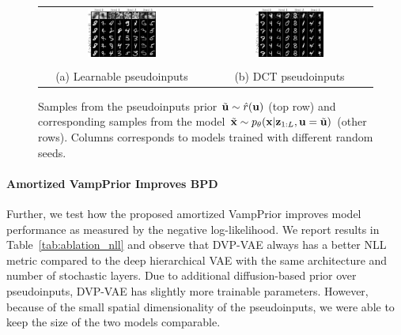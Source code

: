 \begin{figure}[t]
    \begin{tabular}{cc}
        \includegraphics[width=0.43\textwidth]{pics/5_dvp/mnist_linear_prior_samples.pdf} &
        \includegraphics[width=0.43\textwidth]{pics/5_dvp/mnist_dct_prior_samples_seed.pdf} \\ \\
        (a) Learnable pseudoinputs &
        (b) DCT pseudoinputs \\
    \end{tabular}
    \caption{Samples from the pseudoinputs prior $\Tilde{{\mathbf{u}}} \sim \hat{r}({\mathbf{u}})$ (top row) and corresponding samples from the model $\Tilde{{\mathbf{x}}} \sim p_{\theta}({\mathbf{x}}|{\mathbf{z}}_{1:L}, {\mathbf{u}}=\Tilde{{\mathbf{u}}})$ (other rows). Columns corresponds to models trained with different random seeds.}
    \label{fig:linear_context_sampels}
\end{figure}


\paragraph{Amortized VampPrior Improves BPD}

Further, we test how the proposed amortized VampPrior improves model performance as measured by the negative log-likelihood. We report results in Table~\ref{tab:ablation_nll} and observe that DVP-VAE always has a better NLL metric compared to the deep hierarchical VAE with the same architecture and number of stochastic layers.
Due to additional diffusion-based prior over pseudoinputs, DVP-VAE has slightly more trainable parameters. However, because of the small spatial dimensionality of the pseudoinputs, we were able to keep the size of the two models comparable. 

